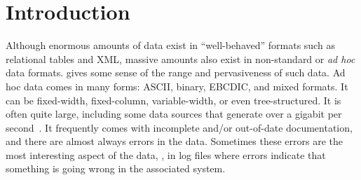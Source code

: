 \section{Introduction}
\label{section:intro}
Although enormous amounts of data exist in ``well-behaved'' formats such
as relational tables and XML, massive amounts also exist in
non-standard or \textit{ad hoc} data formats. 
gives some sense of the range and pervasiveness of such data.
Ad hoc data comes in many forms: ASCII, binary, EBCDIC, and mixed
formats.  It can be fixed-width, fixed-column, variable-width, or even
tree-structured.  It is often quite large, including some data sources
that generate over a gigabit per second~\cite{gigascope}. It frequently
comes with incomplete and/or out-of-date documentation, and there are
almost always errors in the data.  Sometimes these errors are the most
interesting aspect of the data, \eg{}, in log files where
errors indicate that something is going wrong in the associated
system.

